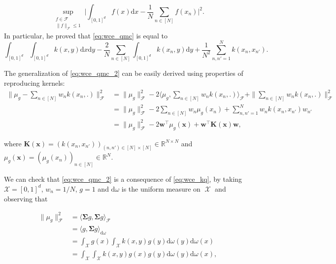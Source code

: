 \documentclass[twoside,11pt]{book}
\numberwithin{theorem}{chapter}
\numberwithin{definition}{chapter}
\numberwithin{proposition}{chapter}
\numberwithin{corollary}{chapter}
\numberwithin{example}{chapter}
\numberwithin{lemma}{chapter}
\numberwithin{assumption}{chapter}
\numberwithin{equation}{chapter}
\numberwithin{figure}{chapter}
\DeclareMathOperator{\Tran}{\intercal}
\DeclareMathOperator{\X}{\mathcal{X}}
\begin{document}
\begin{equation}\label{eq:wce_qmc}
 \sup\limits_{\substack{f \in \mathcal{F}\\ \|f\|_{\mathcal{F}} \leq 1}} \bigg|\int_{[0,1]^{d}} f(x)\mathrm{d}x - \frac{1}{N}\sum\limits_{n \in [N]} f(x_{n}) \bigg|^{2}.
\end{equation}
In particular, he proved that \eqref{eq:wce_qmc} is equal to 
\begin{equation}\label{eq:wce_qmc_2}
 \int_{[0,1]^{d}}\int_{[0,1]^{d}} k(x,y) \mathrm{d}x \mathrm{d}y - \frac{2}{N}\sum\limits_{n \in [N]} \int_{[0,1]^{d}} k(x_{n},y) \mathrm{d} y + \frac{1}{N^2}\sum\limits_{n,n'=1}^{N}k(x_{n},x_{n'}).
\end{equation}

The generalization of \eqref{eq:wce_qmc_2} can be easily derived using properties of reproducing kernels:
\begin{align}
\|\mu_{g} - \sum\limits_{n \in [N]}w_{n} k(x_{n},.) \|_{\mathcal{F}}^{2} & = \|\mu_{g}\|_{\mathcal{F}}^{2} - 2 \langle \mu_{g}, \sum\limits_{n \in [N]}w_{n} k(x_{n},.)  \rangle_{\mathcal{F}} + \|\sum\limits_{n \in [N]}w_{n} k(x_{n},.)\|_{\mathcal{F}}^{2}\\
& = \|\mu_{g}\|_{\mathcal{F}}^{2} - 2 \sum\limits_{n \in [N]} w_{n} \mu_{g}(x_{n}) + \sum\limits_{n,n'=1}^{N}w_{n}k(x_{n},x_{n'})w_{n'}\\
& \label{eq:wce_kq}= \|\mu_{g}\|_{\mathcal{F}}^{2} - 2 \bm{w}^{\Tran} \mu_{g}(\bm{x}) + \bm{w}^{\Tran} \bm{K}(\bm{x})\bm{w},
\end{align}

where $\bm{K}(\bm{x}) = (k(x_{n},x_{n'}))_{(n,n') \in [N] \times [N]} \in \mathbb{R}^{N \times N}$ and $\mu_{g}(\bm{x}) = (\mu_{g}(x_{n}))_{n \in [N]} \in \mathbb{R}^{N}$.


We can check that \eqref{eq:wce_qmc_2} is a consequence of \eqref{eq:wce_kq}, by taking $\mathcal{X} = [0,1]^{d}$, $w_{n}=1/N$, $g=1$ and $\mathrm{d}\omega$ is the uniform measure on $\X$ and observing that

\begin{align}
\|\mu_{g}\|_{\mathcal{F}}^{2} & = \langle \bm{\Sigma} g,\bm{\Sigma} g \rangle_{\mathcal{F}}\\
& = \langle g, \bm{\Sigma} g \rangle_{\mathrm{d}\omega}\\
& = \int_{\mathcal{X}} g(x) \int_{\mathcal{X}} k(x,y) g(y)\mathrm{d}\omega(y) \mathrm{d}\omega(x)\\
& = \int_{\mathcal{X}} \int_{\mathcal{X}} k(x,y) g(x) g(y)\mathrm{d}\omega(y) \mathrm{d}\omega(x),
\end{align}
\end{document}
